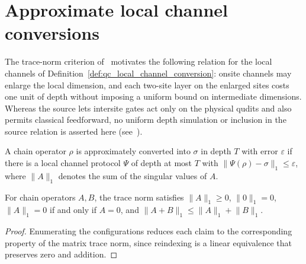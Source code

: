\section{Approximate local channel conversions}

The trace-norm criterion of~\cite[paragraph ``Phases of matter'']{Piroli2021LOCC}
motivates the following relation for the local channels of
Definition~\ref{def:qc_local_channel_conversion}: onsite channels may enlarge
the local dimension, and each two-site layer on the enlarged sites costs one
unit of depth without imposing a uniform bound on intermediate dimensions.
Whereas the source lets intersite gates act only on the physical qudits and
also permits classical feedforward, no uniform depth simulation or inclusion
in the source relation is asserted here
(see~\cite{gap:psc21_local_channel_phase_scope}).

\begin{definition}
    \label{def:qc_approx_local_channel_conversion}
    \leanok
    A chain operator $\rho$ is approximately converted into $\sigma$ in
    depth $T$ with error $\varepsilon$ if there is a local channel protocol
    $\Psi$ of depth at most $T$ with
    $\lVert\Psi(\rho)-\sigma\rVert_1\le\varepsilon$, where
    $\lVert A\rVert_1$ denotes the sum of the singular values of $A$.
\end{definition}

\begin{lemma}
    \label{thm:qc_chain_trace_norm}
    \leanok
    For chain operators $A,B$, the trace norm satisfies
    $\lVert A\rVert_1\ge0$, $\lVert0\rVert_1=0$,
    $\lVert A\rVert_1=0$ if and only if $A=0$, and
    $\lVert A+B\rVert_1\le\lVert A\rVert_1+\lVert B\rVert_1$.
\end{lemma}
\begin{proof}
    \leanok
    Enumerating the configurations reduces each claim to the corresponding
    property of the matrix trace norm, since reindexing is a linear
    equivalence that preserves zero and addition.
\end{proof}

